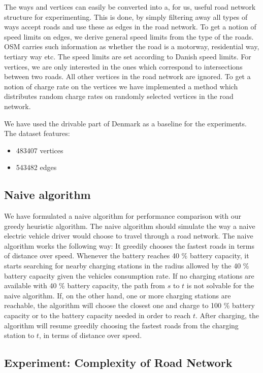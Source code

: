 The ways and vertices can easily be converted into a, for us, useful road network structure for experimenting. This is done, by simply filtering away all types of ways accept roads and use these as edges in the road network. To get a notion of speed limits on edges, we derive general speed limits from the type of the roads. OSM carries such information as whether the road is a motorway, residential way, tertiary way etc. The speed limits are set according to Danish speed limits. For vertices, we are only interested in the ones which correspond to intersections between two roads. All other vertices in the road network are ignored. To get a notion of charge rate on the vertices we have implemented a method which distributes random charge rates on randomly selected vertices in the road network.

We have used the drivable part of Denmark as a baseline for the experiments. The dataset features:
\begin{itemize}
    \item 483407 vertices
    \item 543482 edges
\end{itemize}

\subsection{Naive algorithm}
\label{sub:naivealgorithm}
We have formulated a naive algorithm for performance comparison with our greedy heuristic algorithm. The naive algorithm should simulate the way a naive electric vehicle driver would choose to travel through a road network. The naive algorithm works the following way: It greedily chooses the fastest roads in terms of distance over speed. Whenever the battery reaches 40 \% battery capacity, it starts searching for nearby charging stations in the radius allowed by the 40 \% battery capacity given the vehicles consumption rate. If no charging stations are available with 40 \% battery capacity, the path from $s$ to $t$ is not solvable for the naive algorithm. If, on the other hand, one or more charging stations are reachable, the algorithm will choose the closest one and charge to 100 \% battery capacity or to the battery capacity needed in order to reach $t$. After charging, the algorithm will resume greedily choosing the fastest roads from the charging station to $t$, in terms of distance over speed.

\subsection{Experiment: Complexity of Road Network}

